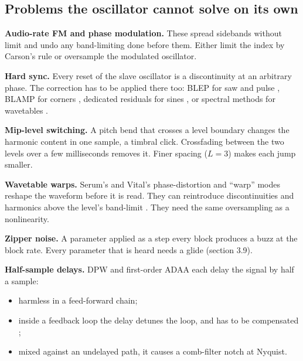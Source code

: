 \documentclass[conference]{IEEEtran}
\begin{document}
\setcounter{subsection}{6}
\subsection{Problems the oscillator cannot solve on its own}
\textbf{Audio-rate FM and phase modulation.} These spread sidebands without limit and undo any band-limiting done before them. Either limit the index by Carson's rule \cite{r24} or oversample the modulated oscillator.

\textbf{Hard sync.} Every reset of the slave oscillator is a discontinuity at an arbitrary phase. The correction has to be applied there too: BLEP for saw and pulse \cite{r4}, BLAMP for corners \cite{r11}, dedicated residuals for sines \cite{r20}, or spectral methods for wavetables \cite{r27}.

\textbf{Mip-level switching.} A pitch bend that crosses a level boundary changes the harmonic content in one sample, a timbral click. Crossfading between the two levels over a few milliseconds removes it. Finer spacing ($L = 3$) makes each jump smaller.

\textbf{Wavetable warps.} Serum's and Vital's phase-distortion and ``warp'' modes reshape the waveform before it is read. They can reintroduce discontinuities and harmonics above the level's band-limit \cite{S1,S3}. They need the same oversampling as a nonlinearity.

\textbf{Zipper noise.} A parameter applied as a step every block produces a buzz at the block rate. Every parameter that is heard needs a glide (section 3.9).

\textbf{Half-sample delays.} DPW and first-order ADAA each delay the signal by half a sample:

\begin{itemize}
\item harmless in a feed-forward chain;
\item inside a feedback loop the delay detunes the loop, and has to be compensated \cite{r16};
\item mixed against an undelayed path, it causes a comb-filter notch at Nyquist.
\end{itemize}

\setcounter{subsection}{7}
\end{document}
